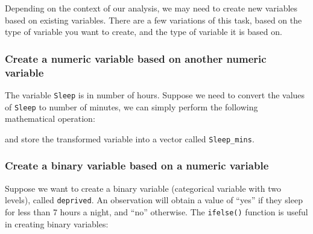\documentclass[
]{book}
\newenvironment{Shaded}{\begin{snugshade}}{\end{snugshade}}
\newcommand{\DecValTok}[1]{\textcolor[rgb]{0.00,0.00,0.81}{#1}}
\newcommand{\FunctionTok}[1]{\textcolor[rgb]{0.13,0.29,0.53}{\textbf{#1}}}
\newcommand{\NormalTok}[1]{#1}
\newcommand{\OtherTok}[1]{\textcolor[rgb]{0.56,0.35,0.01}{#1}}
\newcommand{\SpecialCharTok}[1]{\textcolor[rgb]{0.81,0.36,0.00}{\textbf{#1}}}
\newcommand{\StringTok}[1]{\textcolor[rgb]{0.31,0.60,0.02}{#1}}
\begin{document}
Depending on the context of our analysis, we may need to create new variables based on existing variables. There are a few variations of this task, based on the type of variable you want to create, and the type of variable it is based on.

\hypertarget{create-a-numeric-variable-based-on-another-numeric-variable}{%
\subsubsection{Create a numeric variable based on another numeric variable}\label{create-a-numeric-variable-based-on-another-numeric-variable}}

The variable \texttt{Sleep} is in number of hours. Suppose we need to convert the values of \texttt{Sleep} to number of minutes, we can simply perform the following mathematical operation:

\begin{Shaded}
\end{Shaded}

and store the transformed variable into a vector called \texttt{Sleep\_mins}.

\hypertarget{create-a-binary-variable-based-on-a-numeric-variable}{%
\subsubsection{Create a binary variable based on a numeric variable}\label{create-a-binary-variable-based-on-a-numeric-variable}}

Suppose we want to create a binary variable (categorical variable with two levels), called \texttt{deprived}. An observation will obtain a value of ``yes'' if they sleep for less than 7 hours a night, and ``no'' otherwise. The \texttt{ifelse()} function is useful in creating binary variables:

\begin{Shaded}
\end{Shaded}
\end{document}
